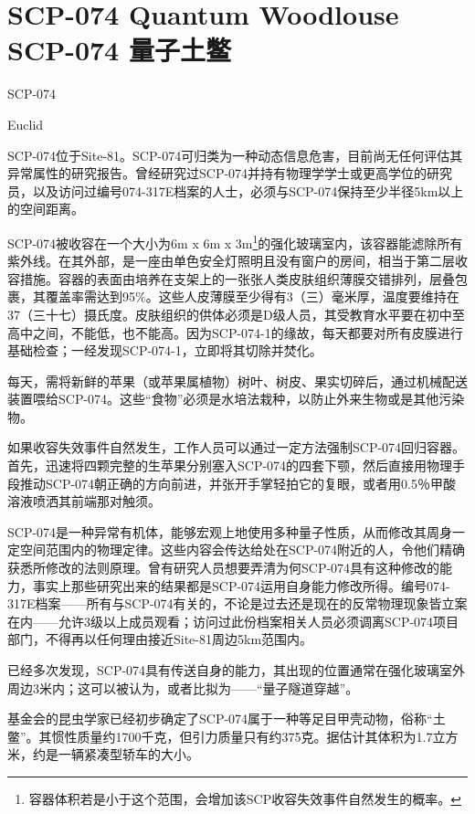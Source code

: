 \chapter[SCP-074 量子土鳖]{
    SCP-074 Quantum Woodlouse\\
    SCP-074 量子土鳖
}

\label{chap:SCP-074}

SCP-074

Euclid


SCP-074位于Site-81。SCP-074可归类为一种动态信息危害，目前尚无任何评估其异常属性的研究报告。曾经研究过SCP-074并持有物理学学士或更高学位的研究员，以及访问过编号074-317E档案的人士，必须与SCP-074保持至少半径5km以上的空间距离。

SCP-074被收容在一个大小为6m x 6m x 3m\footnote{容器体积若是小于这个范围，会增加该SCP收容失效事件自然发生的概率。}的强化玻璃室内，该容器能滤除所有紫外线。在其外部，是一座由单色安全灯照明且没有窗户的房间，相当于第二层收容措施。容器的表面由培养在支架上的一张张人类皮肤组织薄膜交错排列，层叠包裹，其覆盖率需达到95\%。这些人皮薄膜至少得有3（三）毫米厚，温度要维持在37（三十七）摄氏度。皮肤组织的供体必须是D级人员，其受教育水平要在初中至高中之间，不能低，也不能高。因为SCP-074-1的缘故，每天都要对所有皮膜进行基础检查；一经发现SCP-074-1，立即将其切除并焚化。

每天，需将新鲜的苹果（或苹果属植物）树叶、树皮、果实切碎后，通过机械配送装置喂给SCP-074。这些“食物”必须是水培法栽种，以防止外来生物或是其他污染物。

如果收容失效事件自然发生，工作人员可以通过一定方法强制SCP-074回归容器。首先，迅速将四颗完整的生苹果分别塞入SCP-074的四套下颚，然后直接用物理手段推动SCP-074朝正确的方向前进，并张开手掌轻拍它的复眼，或者用0.5％甲酸溶液喷洒其前端那对触须。

SCP-074是一种异常有机体，能够宏观上地使用多种量子性质，从而修改其周身一定空间范围内的物理定律。这些内容会传达给处在SCP-074附近的人，令他们精确获悉所修改的法则原理。曾有研究人员想要弄清为何SCP-074具有这种修改的能力，事实上那些研究出来的结果都是SCP-074运用自身能力修改所得。编号074-317E档案——所有与SCP-074有关的，不论是过去还是现在的反常物理现象皆立案在内——允许3级以上成员观看；访问过此份档案相关人员必须调离SCP-074项目部门，不得再以任何理由接近Site-81周边5km范围内。

已经多次发现，SCP-074具有传送自身的能力，其出现的位置通常在强化玻璃室外周边3米内；这可以被认为，或者比拟为——“量子隧道穿越”。

基金会的昆虫学家已经初步确定了SCP-074属于一种等足目甲壳动物，俗称“土鳖”。其惯性质量约1700千克，但引力质量只有约375克。据估计其体积为1.7立方米，约是一辆紧凑型轿车的大小。

